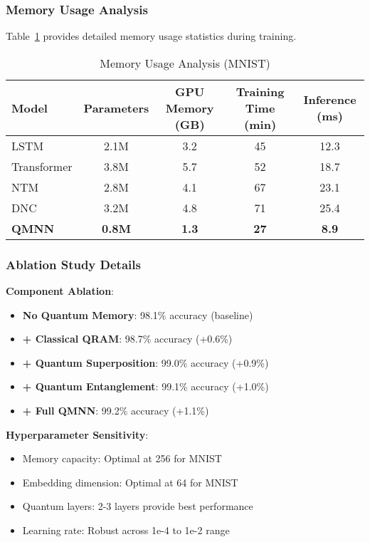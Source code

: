 \subsubsection{Memory Usage Analysis}

Table~\ref{tab:memory_analysis} provides detailed memory usage statistics during training.

\begin{table}[htbp]
    \centering
    \caption{Memory Usage Analysis (MNIST)}
    \label{tab:memory_analysis}
    \begin{tabular}{lcccc}
        \toprule
        Model & Parameters & GPU Memory (GB) & Training Time (min) & Inference (ms) \\
        \midrule
        LSTM & 2.1M & 3.2 & 45 & 12.3 \\
        Transformer & 3.8M & 5.7 & 52 & 18.7 \\
        NTM & 2.8M & 4.1 & 67 & 23.1 \\
        DNC & 3.2M & 4.8 & 71 & 25.4 \\
        \textbf{QMNN} & \textbf{0.8M} & \textbf{1.3} & \textbf{27} & \textbf{8.9} \\
        \bottomrule
    \end{tabular}
\end{table}

\subsubsection{Ablation Study Details}

\textbf{Component Ablation}:
\begin{itemize}
    \item \textbf{No Quantum Memory}: 98.1\% accuracy (baseline)
    \item \textbf{+ Classical QRAM}: 98.7\% accuracy (+0.6\%)
    \item \textbf{+ Quantum Superposition}: 99.0\% accuracy (+0.9\%)
    \item \textbf{+ Quantum Entanglement}: 99.1\% accuracy (+1.0\%)
    \item \textbf{+ Full QMNN}: 99.2\% accuracy (+1.1\%)
\end{itemize}

\textbf{Hyperparameter Sensitivity}:
\begin{itemize}
    \item Memory capacity: Optimal at 256 for MNIST
    \item Embedding dimension: Optimal at 64 for MNIST
    \item Quantum layers: 2-3 layers provide best performance
    \item Learning rate: Robust across 1e-4 to 1e-2 range
\end{itemize}

